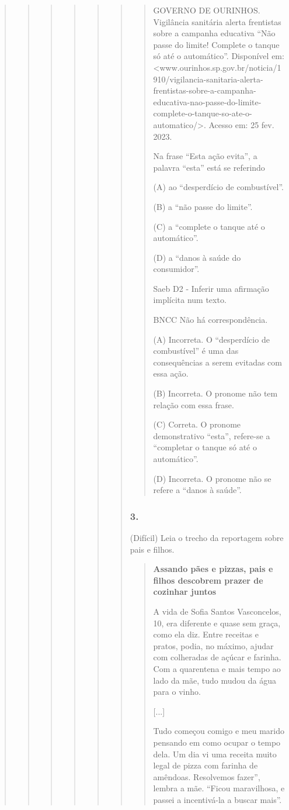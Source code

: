 \begin{quote}
\begin{quote}
\begin{quote}
\begin{quote}
\begin{quote}
\begin{quote}
\begin{quote}
GOVERNO DE OURINHOS. Vigilância sanitária alerta frentistas sobre a
campanha educativa ``Não passe do limite! Complete o tanque só até o
automático''. Disponível em:
\textless{}www.ourinhos.sp.gov.br/noticia/1910/vigilancia-sanitaria-alerta-frentistas-sobre-a-campanha-educativa-nao-passe-do-limite-complete-o-tanque-so-ate-o-automatico/\textgreater{}.
Acesso em: 25 fev. 2023.

Na frase ``Esta ação evita'', a palavra ``esta'' está se referindo

(A) ao ``desperdício de combustível''.

(B) a ``não passe do limite''.

(C) a ``complete o tanque até o automático''.

(D) a ``danos à saúde do consumidor''.

Saeb D2 - Inferir uma afirmação implícita num texto.

BNCC Não há correspondência.

(A) Incorreta. O ``desperdício de combustível'' é uma das consequências
a serem evitadas com essa ação.

(B) Incorreta. O pronome não tem relação com essa frase.

(C) Correta. O pronome demonstrativo ``esta'', refere-se a ``completar o
tanque só até o automático''.

(D) Incorreta. O pronome não se refere a ``danos à saúde''.
\end{quote}

\subsubsection{3. }\label{section-79}

(Difícil) Leia o trecho da reportagem sobre pais e filhos.

\begin{quote}
\textbf{Assando pães e pizzas, pais e filhos descobrem prazer de
cozinhar juntos}

A vida de Sofia Santos Vasconcelos, 10, era diferente e quase sem graça,
como ela diz. Entre receitas e pratos, podia, no máximo, ajudar com
colheradas de açúcar e farinha. Com a quarentena e mais tempo ao lado da
mãe, tudo mudou da água para o vinho.

{[}...{]}

Tudo começou comigo e meu marido pensando em como ocupar o tempo dela.
Um dia vi uma receita muito legal de pizza com farinha de amêndoas.
Resolvemos fazer'', lembra a mãe. ``Ficou maravilhosa, e passei a
incentivá-la a buscar mais''.


\end{quote}
\end{quote}
\end{quote}
\end{quote}
\end{quote}
\end{quote}
\end{quote}

